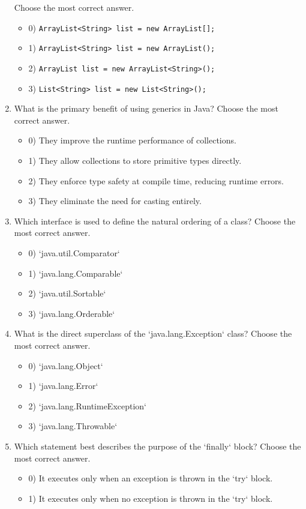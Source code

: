 \documentclass[12pt]{article}
\begin{document}
\begin{enumerate}[label=(\arabic*)]
Choose the most correct answer. 
\begin{itemize}
\item 0) \verb|ArrayList<String> list = new ArrayList[];|
\item 1) \verb|ArrayList<String> list = new ArrayList();|
\item 2) \verb|ArrayList list = new ArrayList<String>();|
\item 3) \verb|List<String> list = new List<String>();|
\end{itemize}
\item What is the primary benefit of using generics in Java?
Choose the most correct answer. 
\begin{itemize}
\item 0) They improve the runtime performance of collections.
\item 1) They allow collections to store primitive types directly.
\item 2) They enforce type safety at compile time, reducing runtime errors.
\item 3) They eliminate the need for casting entirely.
\end{itemize}
\item Which interface is used to define the natural ordering of a class?
Choose the most correct answer. 
\begin{itemize}
\item 0) `java.util.Comparator`
\item 1) `java.lang.Comparable`
\item 2) `java.util.Sortable`
\item 3) `java.lang.Orderable`
\end{itemize}
\item What is the direct superclass of the `java.lang.Exception` class?
Choose the most correct answer. 
\begin{itemize}
\item 0) `java.lang.Object`
\item 1) `java.lang.Error`
\item 2) `java.lang.RuntimeException`
\item 3) `java.lang.Throwable`
\end{itemize}
\item Which statement best describes the purpose of the `finally` block?
Choose the most correct answer. 
\begin{itemize}
\item 0) It executes only when an exception is thrown in the `try` block.
\item 1) It executes only when no exception is thrown in the `try` block.

\end{itemize}
\end{enumerate}
\end{document}
